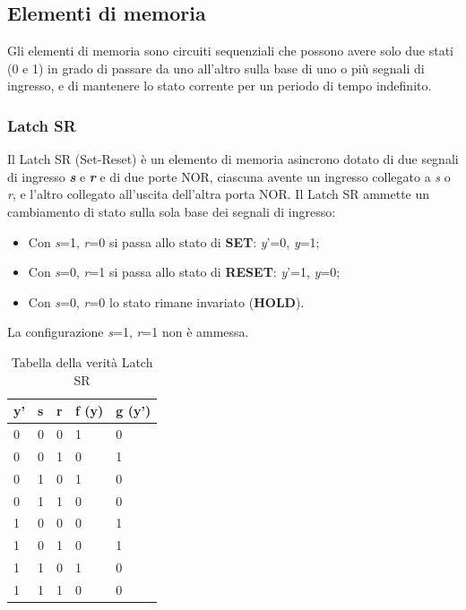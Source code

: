 \documentclass[10pt]{article}
\begin{document}
\begin{itemize}
\subsection{Elementi di memoria}
Gli elementi di memoria sono circuiti sequenziali che possono avere solo due stati (0 e 1) in grado di passare da uno all'altro sulla base di uno o più segnali di ingresso, e di mantenere lo stato
corrente per un periodo di tempo indefinito.  

\subsubsection{Latch SR}
Il Latch SR (Set-Reset) è un elemento di memoria asincrono dotato di due segnali di ingresso \textbf{\emph{s}} e \textbf{\emph{r}} e di due porte NOR, ciascuna avente un ingresso collegato a 
\emph{s} o \emph{r}, e l'altro collegato all'uscita dell'altra porta NOR.
Il Latch SR ammette un cambiamento di stato sulla sola base dei segnali di ingresso:
\begin{itemize}
    \item Con \emph{s}=1, \emph{r}=0 si passa allo stato di \textbf{SET}: \emph{y}'=0, \emph{y}=1;
    \item Con \emph{s}=0, \emph{r}=1 si passa allo stato di \textbf{RESET}: \emph{y}'=1, \emph{y}=0;
    \item Con \emph{s}=0, \emph{r}=0 lo stato rimane invariato (\textbf{HOLD}).
\end{itemize}
La configurazione \emph{s}=1, \emph{r}=1 non è ammessa. 

\begin{table}[H]
    \begin{minipage}[b]{\textwidth}
    \centering
    \begin{tabular}{|lll|ll|}
        \hline
        \textbf{y'} & \textbf{s} & \textbf{r} & \textbf{f (y)} & \textbf{g (y')} \\ \hline
        0           & 0          & 0          & 1              & 0               \\ 
        0           & 0          & 1          & 0              & 1               \\ 
        0           & 1          & 0          & 1              & 0               \\ 
        0           & 1          & 1          & 0              & 0               \\ 
        1           & 0          & 0          & 0              & 1               \\ 
        1           & 0          & 1          & 0              & 1               \\ 
        1           & 1          & 0          & 1              & 0               \\ 
        1           & 1          & 1          & 0              & 0               \\ \hline
        \end{tabular}
        \caption{Tabella della verità Latch SR}
        \label{tab:my-table}
    \end{minipage}
\end{table}


\end{itemize}
\end{document}
